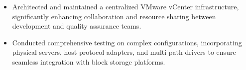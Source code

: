 \documentclass[10pt]{article}       %
\begin{document}
\begin{itemize}
  \item Architected and maintained a centralized VMware vCenter infrastructure, significantly enhancing collaboration and resource sharing between development and quality assurance teams.
  \item Conducted comprehensive testing on complex configurations, incorporating physical servers, host protocol adapters, and multi-path drivers to ensure seamless integration with block storage platforms.
\end{itemize}



\end{document}
